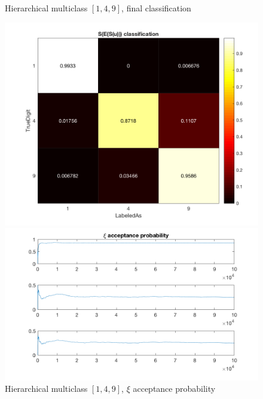 \documentclass{siamart1116}
\begin{document}
    \begin{figure}[!htb]
        \begin{minipage}{0.48\textwidth}
            \centering
            \caption{\label{fig:multiclass_hier_t_a_same_table} Hierarchical multiclass $[1, 4, 9]$, final classification}
            \includegraphics[width=\linewidth]{multiclass/hier_t_a_same/table.png}
        \end{minipage}\hfill
        \begin{minipage}{0.48\textwidth}
            \centering
            \caption{\label{fig:multiclass_hier_t_a_same_accept} Hierarchical multiclass $[1, 4, 9]$, $\xi$ acceptance probability}
            \includegraphics[width=\linewidth]{multiclass/hier_t_a_same/xi_accept.png}
        \end{minipage}
    \end{figure}
\end{document}
